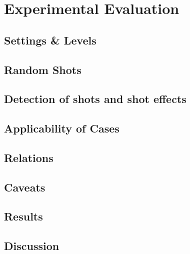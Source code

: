 \section{Experimental Evaluation}\label{sec:experimental}



\subsection{Settings \& Levels}\label{subsec:experimental-settings}





\subsection{Random Shots}\label{subsec:experimental-random-shots}


\subsection{Detection of shots and shot effects}


\subsection{Applicability of Cases}\label{subsec:experimental-applicability}


\subsection{Relations}\label{subsec:experimental-predicates}


\subsection{Caveats}\label{subsec:experimental-caveats}
%

%
\subsection{Results}\label{subsec:experimental-results}


\subsection{Discussion}\label{subsec:experimental-discussion}



